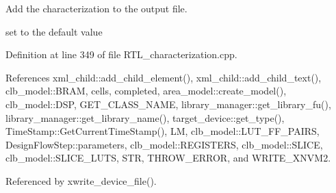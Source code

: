 Add the characterization to the output file. 

set to the default value 

Definition at line 349 of file R\+T\+L\+\_\+characterization.\+cpp.



References xml\+\_\+child\+::add\+\_\+child\+\_\+element(), xml\+\_\+child\+::add\+\_\+child\+\_\+text(), clb\+\_\+model\+::\+B\+R\+AM, cells, completed, area\+\_\+model\+::create\+\_\+model(), clb\+\_\+model\+::\+D\+SP, G\+E\+T\+\_\+\+C\+L\+A\+S\+S\+\_\+\+N\+A\+ME, library\+\_\+manager\+::get\+\_\+library\+\_\+fu(), library\+\_\+manager\+::get\+\_\+library\+\_\+name(), target\+\_\+device\+::get\+\_\+type(), Time\+Stamp\+::\+Get\+Current\+Time\+Stamp(), LM, clb\+\_\+model\+::\+L\+U\+T\+\_\+\+F\+F\+\_\+\+P\+A\+I\+RS, Design\+Flow\+Step\+::parameters, clb\+\_\+model\+::\+R\+E\+G\+I\+S\+T\+E\+RS, clb\+\_\+model\+::\+S\+L\+I\+CE, clb\+\_\+model\+::\+S\+L\+I\+C\+E\+\_\+\+L\+U\+TS, S\+TR, T\+H\+R\+O\+W\+\_\+\+E\+R\+R\+OR, and W\+R\+I\+T\+E\+\_\+\+X\+N\+V\+M2.



Referenced by xwrite\+\_\+device\+\_\+file().

